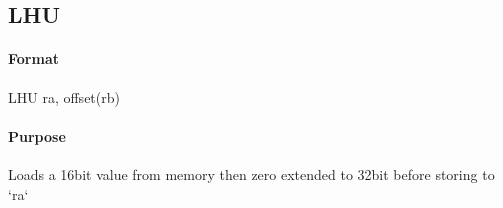 \subsection{LHU}


\paragraph{Format} LHU ra, offset(rb)

\paragraph{Purpose} Loads a 16bit value from memory then zero extended to 32bit before storing to `ra`
